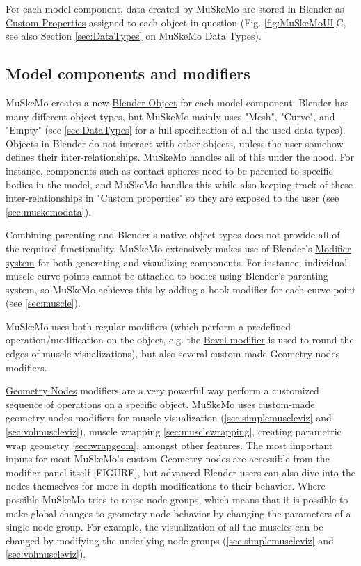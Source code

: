 \documentclass{article}
\begin{document}
For each model component, data created by MuSkeMo are stored in Blender as \href{https://docs.blender.org/manual/en/latest/files/custom_properties.html}{Custom Properties} assigned to each object in question (Fig. \ref{fig:MuSkeMoUI}C, see also Section \ref{sec:DataTypes} on MuSkeMo Data Types).

\subsection{Model components and modifiers}

MuSkeMo creates a new \href{https://docs.blender.org/manual/en/latest/scene_layout/object/types.html}{Blender Object} for each model component. Blender has many different object types, but MuSkeMo mainly uses "Mesh", "Curve", and "Empty" (see \ref{sec:DataTypes} for a full specification of all the used data types). Objects in Blender do not interact with other objects, unless the user somehow defines their inter-relationships. MuSkeMo handles all of this under the hood. For instance, components such as contact spheres need to be parented to specific bodies in the model, and MuSkeMo handles this while also keeping track of these inter-relationships in "Custom properties" so they are exposed to the user (see \ref{sec:muskemodata}).

Combining parenting and Blender's native object types does not provide all of the required functionality. MuSkeMo extensively makes use of Blender's \href{https://docs.blender.org/manual/en/latest/modeling/modifiers/index.html}{Modifier system} for both generating and visualizing components. For instance, individual muscle curve points cannot be attached to bodies using Blender's parenting system, so MuSkeMo achieves this by adding a hook modifier for each curve point (see \ref{sec:muscle}). 

MuSkeMo uses both regular modifiers (which perform a predefined operation/modification on the object, e.g. the \href{https://docs.blender.org/manual/en/latest/modeling/modifiers/generate/bevel.html}{Bevel modifier} is used to round the edges of muscle visualizations), but also several custom-made Geometry nodes modifiers.

\href{https://docs.blender.org/manual/en/latest/modeling/geometry_nodes/index.html}{Geometry Nodes} modifiers are a very powerful way perform a customized sequence of operations on a specific object. MuSkeMo uses custom-made geometry nodes modifiers for muscle visualization (\ref{sec:simplemuscleviz} and \ref{sec:volmuscleviz}), muscle wrapping \ref{sec:musclewrapping}, creating parametric wrap geometry \ref{sec:wrapgeom}, amongst other features. The most important inputs for most MuSkeMo's custom Geometry nodes are accessible from the modifier panel itself [FIGURE], but advanced Blender users can also dive into the nodes themselves for more in depth modifications to their behavior. Where possible MuSkeMo tries to reuse node groups, which means that it is possible to make global changes to geometry node behavior by changing the parameters of a single node group. For example, the visualization of all the muscles can be changed by modifying the underlying node groups (\ref{sec:simplemuscleviz} and \ref{sec:volmuscleviz}).
\end{document}
